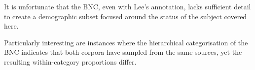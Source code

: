 

It is unfortunate that the BNC, even with Lee's annotation, lacks sufficient detail to create a demographic subset focused around the status of the subject covered here.


Particularly interesting are instances where the hierarchical categorisation of the BNC indicates that both corpora have sampled from the same sources, yet the resulting within-category proportions differ.  







